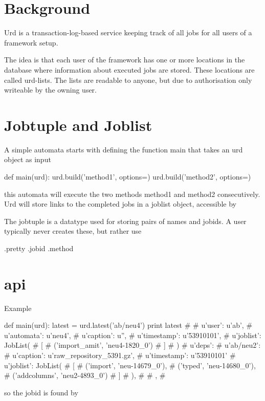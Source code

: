 \section{Background}

Urd is a transaction-log-based service keeping track of all jobs for
all users of a framework setup.

The idea is that each user of the framework has one or more locations
in the database where information about executed jobs are stored.
These locations are called urd-lists.  The lists are readable to
anyone, but due to authorisation only writeable by the owning user.




\section{Jobtuple and Joblist}

A simple automata starts with defining the function main that takes an
urd object as input

\begin{python}
def main(urd):
  urd.build('method1', options={})
  urd.build('method2', options={})
\end{python}
this automata will execute the two methods method1 and method2
consecutively.  Urd will store links to the completed jobs in a
joblist object, accessible by




The jobtuple is a datatype used for storing pairs of names and jobids.
A user typically never creates these, but rather use
\begin{python}

\end{python}


.pretty
.jobid
.method


\section{api}
Example

\begin{python}
def main(urd):
  latest = urd.latest('ab/neu4')
  print latest
#{
#  u'user': u'ab',
#  u'automata': u'neu4',
#  u'caption': u'',
#  u'timestamp': u'53910101',
#  u'joblist': JobList(
#    [
#      ('import_amit', 'neu4-1820_0')
#    ]
#  )
#  u'deps': {
#    u'ab/neu2': {
#      u'caption': u'raw_repository_5391.gz',
#      u'timestamp': u'53910101'
#      u'joblist': JobList(
#        [
#          ('import', 'neu-14679_0'),
#          ('typed', 'neu-14680_0'),
#          ('addcolumns', 'neu2-4893_0')
#        ]
#      ),
#    }
#  },
#}
\end{python}
so the jobid is found by

